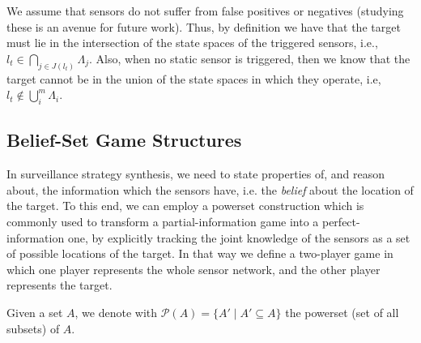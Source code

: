 We assume that sensors do not suffer from  false positives or negatives (studying these is an avenue for future work). Thus, by definition we have that the target must lie in the intersection of the state spaces of the triggered sensors, i.e., $l_t \in \bigcap_{j\in J(l_t)}\Lambda_j$. Also, when no static sensor is triggered,  then we know that the target cannot be in the union of the state spaces in which they operate, i.e, $l_t \notin \bigcup_{i}^m \Lambda_i$.


\subsection{Belief-Set Game Structures}\label{sec:belief-gs}

In surveillance strategy synthesis, we need to state properties of, and reason about, the information which the sensors have, i.e. the \emph{belief} about the location of the target. To this end, we can employ a powerset construction which is commonly used to transform a partial-information game into a perfect-information one, by explicitly tracking the joint knowledge of the sensors as a set of possible locations of the target. In that way we define a two-player game in which one player represents the whole sensor network, and the other player represents the target.

Given a set $A$, we denote with $\mathcal{P}(A) = \{A' \mid A'\subseteq A\}$ the powerset (set of all subsets) of $A$.

